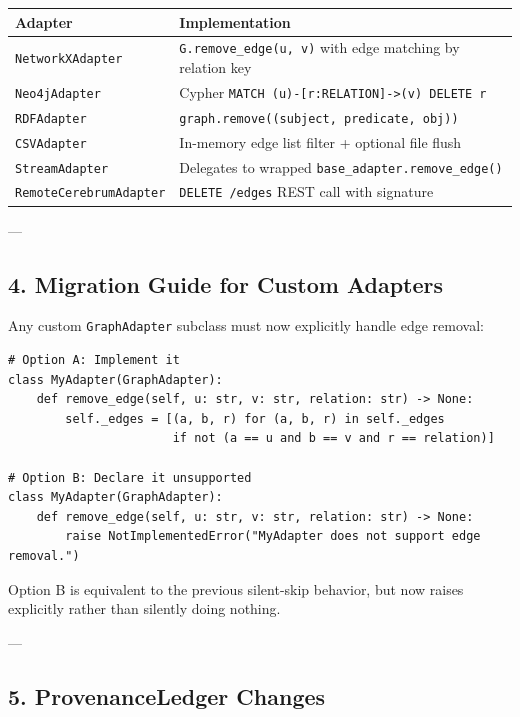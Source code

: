\begin{center}
\begin{tabularx}{\columnwidth}{|>{\raggedright\arraybackslash}X|>{\raggedright\arraybackslash}X|}
\hline
Adapter & Implem\-entation \\ \hline
\texttt{NetworkXAdapter} & \texttt{G.remove\_edge(u, v)} with edge matching by relation key \\ \hline
\texttt{Neo4jAdapter} & Cypher \texttt{MATCH (u)-[r:RELATION]-\textgreater (v) DELETE r} \\ \hline
\texttt{RDFAdapter} & \texttt{graph.remove((subject, predicate, obj))} \\ \hline
\texttt{CSVAdapter} & In-memory edge list filter + optional file flush \\ \hline
\texttt{StreamAdapter} & Delegates to wrapped \texttt{base\_adapter.remove\_edge()} \\ \hline
\texttt{RemoteCerebrumAdapter} & \texttt{DELETE /edges} REST call with signature \\ \hline
\end{tabularx}
\end{center}

---

\subsection{4. Migration Guide for Custom Adapters}

Any custom \texttt{GraphAdapter} subclass must now explicitly handle edge removal:

\begin{lstlisting}
# Option A: Implement it
class MyAdapter(GraphAdapter):
    def remove_edge(self, u: str, v: str, relation: str) -> None:
        self._edges = [(a, b, r) for (a, b, r) in self._edges
                       if not (a == u and b == v and r == relation)]

# Option B: Declare it unsupported
class MyAdapter(GraphAdapter):
    def remove_edge(self, u: str, v: str, relation: str) -> None:
        raise NotImplementedError("MyAdapter does not support edge removal.")
\end{lstlisting}

Option B is equivalent to the previous silent-skip behavior, but now raises explicitly rather than silently doing nothing.

---

\subsection{5. ProvenanceLedger Changes}

